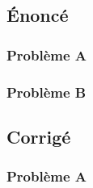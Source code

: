 \documentclass
[
a4paper,                      %
twoside,					  %
12pt,                         %
abstract,		      %
fleqn,                        %
]
{scrartcl} %
\begin{document}
\subsection{\'Enonc\'e}

\subsubsection{Probl\`eme A}

\subsubsection{Probl\`eme B}

\subsection{Corrig\'e}

\subsubsection{Probl\`eme A}
\end{document}
